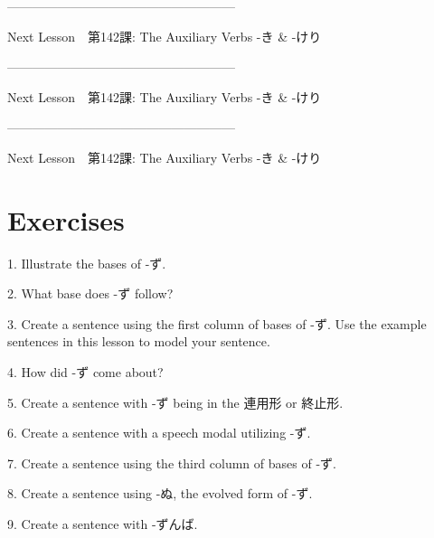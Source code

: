 \par{------------------------------------------------------ }

\par{Next Lesson　\textrightarrow  第142課: The Auxiliary Verbs -き \& -けり  }

\par{------------------------------------------------------ }

\par{Next Lesson　\textrightarrow  第142課: The Auxiliary Verbs -き \& -けり  }

\par{------------------------------------------------------ }

\par{Next Lesson　\textrightarrow  第142課: The Auxiliary Verbs -き \& -けり  }
      
\section{Exercises}
 
\par{1. Illustrate the bases of -ず. }

\par{2. What base does -ず follow? }

\par{3.  Create a sentence using the first column of bases of -ず. Use the example sentences in this lesson to model your sentence. }

\par{4. How did -ず come about? }

\par{5. Create a sentence with -ず being in the 連用形 or 終止形. }

\par{6. Create a sentence with a speech modal utilizing -ず. }

\par{7. Create a sentence using the third column of bases of -ず. }

\par{8. Create a sentence using -ぬ, the evolved form of -ず. }

\par{9. Create a sentence with -ずんば. }
    